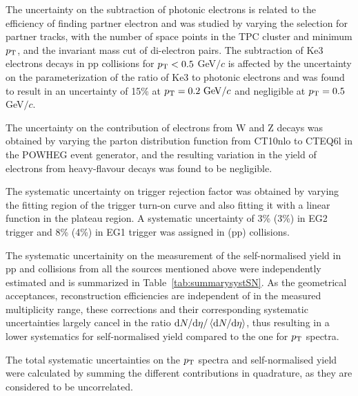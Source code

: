 The uncertainty on the subtraction of photonic electrons is related to the efficiency of finding partner electron and was studied by varying the selection for partner tracks, with the number of space points in the TPC cluster and minimum $p_{\rm{T}}$, and the invariant mass cut of di-electron pairs. The subtraction of Ke3 electrons decays in pp collisions for $p_{\rm{T}} < 0.5$ GeV$/c$ is affected by the uncertainty on the parameterization of the ratio of Ke3 to photonic electrons and was found to result in an uncertainty of 15\% at $p_{\rm{T}} = 0.2~{\rm GeV/}c$ and negligible at $p_{\rm{T}}=0.5$ GeV$/c$. 

The uncertainty on the contribution of electrons from W and Z decays was obtained by varying the parton distribution function from { CT10nlo\cite{Guzzi:2011sv} to CTEQ6l\cite{Pumplin:2002vw}} in the POWHEG event generator, and the resulting variation in the yield of electrons from heavy-flavour decays was found to be negligible. 

The systematic uncertainty on trigger rejection factor was obtained by varying the fitting region of the trigger turn-on curve and also fitting it with a linear function in the plateau region. A systematic uncertainty of 3\% (3\%) in EG2 trigger and 8\% (4\%) in EG1 trigger was assigned in \pPb (pp) collisions.

The systematic uncertainity on the measurement of the self-normalised yield in pp and \pPb collisions from all  the sources mentioned above were independently estimated and is summarized in Table~\ref{tab:summarysystSN}. As the geometrical acceptances, reconstruction efficiencies are independent of \dnchdeta in the measured multiplicity range, these corrections and their corresponding systematic uncertainties largely cancel in the ratio ${\rm d}N/{\rm d}\eta/\left<{\rm d}N/{\rm d}\eta\right>$, thus resulting in a lower systematics for self-normalised yield compared to the one for $p_{\rm{T}}$ spectra. 

The total systematic uncertainties on the $p_{\rm{T}}$ spectra and self-normalised yield were calculated by summing the different contributions in quadrature, as they are considered to be uncorrelated. 
  

